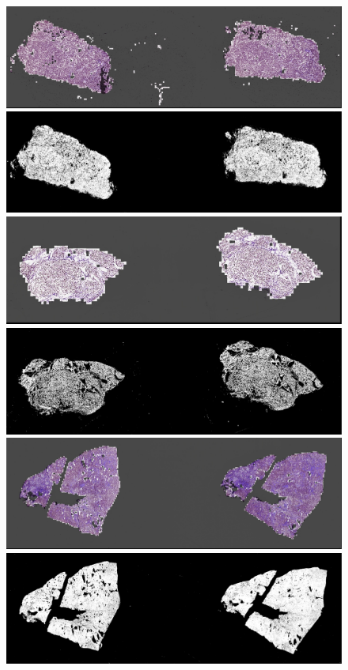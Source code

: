 \begin{enumerate}
    \begin{figure}
        \begin{center}
            \includegraphics[width=0.48\linewidth]{figs/introduction/subs/challenges/evaluate_slides/TCGA-DJ-A1QG-01A-01-TSA.04c62c21-dd45-49ea-a74f-53822defe097__2000_generated_mask.jpg}
            \includegraphics[width=0.48\linewidth]{figs/introduction/subs/challenges/evaluate_slides/TCGA-DJ-A1QG-01A-01-TSA.04c62c21-dd45-49ea-a74f-53822defe097__2000_masked.png}
            \hspace{.2cm}
            \includegraphics[width=0.48\linewidth]{figs/introduction/subs/challenges/evaluate_slides/TCGA-EL-A3TB-11A-01-TS1.6E0966C9-1552-4B30-9008-8ACF737CA8C3__2000_generated_mask.jpg}
            \includegraphics[width=0.48\linewidth]{figs/introduction/subs/challenges/evaluate_slides/TCGA-EL-A3TB-11A-01-TS1.6E0966C9-1552-4B30-9008-8ACF737CA8C3__2000_masked.png}
            \hspace{.2cm}
            \includegraphics[width=0.48\linewidth]{figs/introduction/subs/challenges/evaluate_slides/TCGA-ET-A39O-01A-01-TSA.3829C900-7597-4EA9-AFC7-AA238221CE69_7000_generated_mask.jpg}
            \includegraphics[width=0.48\linewidth]{figs/introduction/subs/challenges/evaluate_slides/TCGA-ET-A39O-01A-01-TSA.3829C900-7597-4EA9-AFC7-AA238221CE69_7000_masked.png}

\end{center}
\end{figure}
\end{enumerate}
